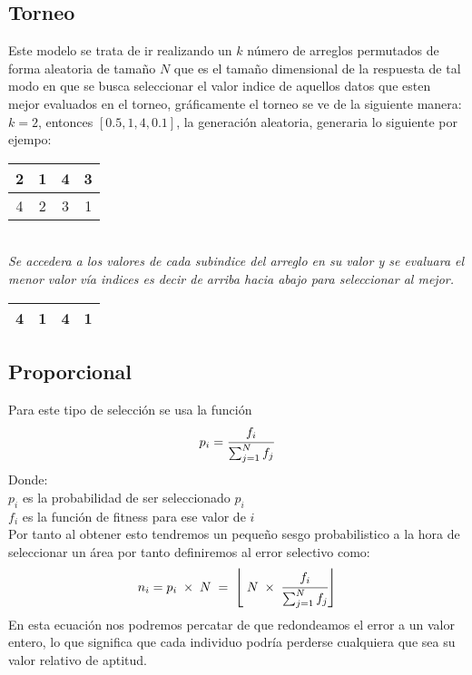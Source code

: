 \documentclass[10pt]{article}
\begin{document}
\subsection{Torneo}
Este modelo se trata de ir realizando un $k$ número de arreglos permutados de forma aleatoria de tamaño $N$ que es el tamaño dimensional de la respuesta de tal modo en que se busca seleccionar el valor indice de aquellos datos que esten mejor evaluados en el torneo, gráficamente el torneo se ve de la siguiente manera:\\
\(\displaystyle k=2\), entonces \(\displaystyle [0.5,1,4,0.1]\), la generación aleatoria, generaria lo siguiente por ejempo:\\
\begin{center}
  \begin{tabular}{|c|c|c|c|}
    \hline
    2&1&4&3\\
    \hline
    4&2&3&1\\
    \hline
  \end{tabular}\\
  \textit{Se accedera a los valores de cada subindice del arreglo en su valor y se evaluara el menor valor vía indices es decir de arriba hacia abajo para seleccionar al mejor.}\\
  \begin{tabular}{|c|c|c|c|}
    \hline
    4&1&4&1\\
    \hline
  \end{tabular}
\end{center}

\subsection{Proporcional}
Para este tipo de selección se usa la función
\[p_{i}=\cfrac{f_{i}}{\sum_{j=1}^{N}f_{j}}\]
Donde:\\
\(\displaystyle p_i\) es la probabilidad de ser seleccionado \(\displaystyle p_{i}\)\\\vspace{0.25cm}
\(\displaystyle f_{i}\) es la función de fitness para ese valor de \(\displaystyle i\)\\\vspace{0.25cm}
Por tanto al obtener esto tendremos un pequeño sesgo probabilistico a la hora de seleccionar un área por tanto definiremos al error selectivo como:
\[n_{i}=p_i\;\times\;N\;=\;\left\lfloor\;N\;\times\;\cfrac{f_{i}}{\sum_{j=1}^{N}f_{j}}\right\rfloor\]
En esta ecuación nos podremos percatar de que redondeamos el error a un valor entero, lo que significa que cada individuo podría perderse cualquiera que sea su valor relativo de aptitud.
\end{document}
